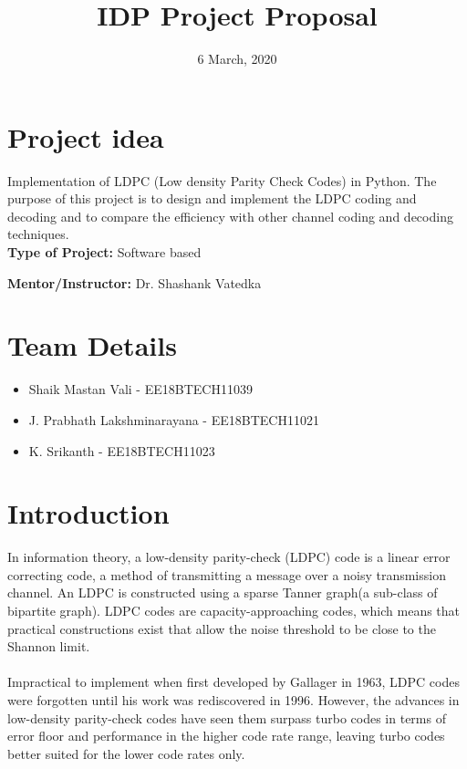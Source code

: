 \documentclass[12pt]{extarticle}
\title{IDP Project Proposal}
\date{6 March, 2020}
\newcommand{\<}{\langle}
\renewcommand{\>}{\rangle}
\theoremstyle{definition}
\begin{document}
\maketitle

\section{Project idea}
Implementation of LDPC (Low density Parity Check Codes) in Python. 
The purpose of this project is to design and implement the LDPC coding and decoding and to compare the efficiency with other channel coding and decoding techniques. \\

\textbf{Type of Project:} Software based \newline

\textbf{Mentor/Instructor:} Dr. Shashank Vatedka

\section{Team Details}
\begin{itemize}
    \item Shaik Mastan Vali - EE18BTECH11039
    \item J. Prabhath Lakshminarayana - EE18BTECH11021
    \item K. Srikanth - EE18BTECH11023
\end{itemize}

\section{Introduction}
In information theory, a low-density parity-check (LDPC) code is a linear error correcting code, a method of transmitting a message over a noisy transmission channel. An LDPC is constructed using a sparse Tanner graph(a sub-class of bipartite graph). LDPC codes are capacity-approaching codes, which means that practical constructions exist that allow the noise threshold to be close to the Shannon limit. \\ \\
Impractical to implement when first developed by Gallager in 1963, LDPC codes were forgotten until his work was rediscovered in 1996. However, the advances in low-density parity-check codes have seen them surpass turbo codes in terms of error floor and performance in the higher code rate range, leaving turbo codes better suited for the lower code rates only. \\
\end{document}
